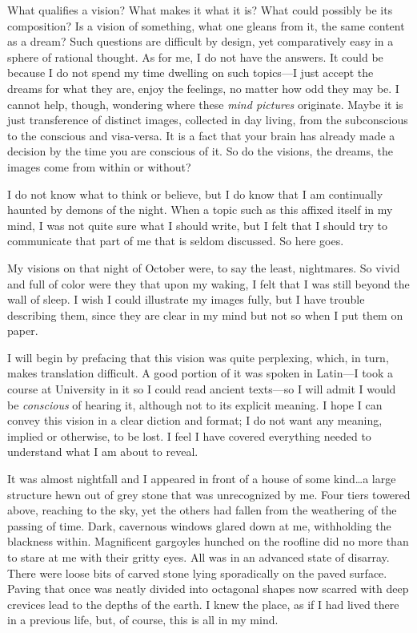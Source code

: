 What qualifies a vision? What makes it what it is? What could possibly
be its composition? Is a vision of something, what one gleans from it,
the same content as a dream? Such questions are difficult by design, yet
comparatively easy in a sphere of rational thought. As for me, I do not
have the answers. It could be because I do not spend my time dwelling on
such topics---I just accept the dreams for what they are, enjoy the
feelings, no matter how odd they may be. I cannot help, though,
wondering where these \emph{mind pictures} originate. Maybe it is just
transference of distinct images, collected in day living, from the
subconscious to the conscious and visa-versa. It is a fact that your
brain has already made a decision by the time you are conscious of it.
So do the visions, the dreams, the images come from within or without?

I do not know what to think or believe, but I do know that I am
continually haunted by demons of the night. When a topic such as this
affixed itself in my mind, I was not quite sure what I should write, but
I felt that I should try to communicate that part of me that is seldom
discussed. So here goes.

My visions on that night of October were, to say the least, nightmares.
So vivid and full of color were they that upon my waking, I felt that I
was still beyond the wall of sleep. I wish I could illustrate my images
fully, but I have trouble describing them, since they are clear in my
mind but not so when I put them on paper.

I will begin by prefacing that this vision was quite perplexing, which,
in turn, makes translation difficult. A good portion of it was spoken in
Latin---I took a course at University in it so I could read ancient
texts---so I will admit I would be \emph{conscious} of hearing it,
although not to its explicit meaning. I hope I can convey this vision in
a clear diction and format; I do not want any meaning, implied or
otherwise, to be lost. I feel I have covered everything needed to
understand what I am about to reveal.

It was almost nightfall and I appeared in front of a house of some
kind\ldots a large structure hewn out of grey stone that was
unrecognized by me. Four tiers towered above, reaching to the sky, yet
the others had fallen from the weathering of the passing of time. Dark,
cavernous windows glared down at me, withholding the blackness within.
Magnificent gargoyles hunched on the roofline did no more than to stare
at me with their gritty eyes. All was in an advanced state of disarray.
There were loose bits of carved stone lying sporadically on the paved
surface. Paving that once was neatly divided into octagonal shapes now
scarred with deep crevices lead to the depths of the earth. I knew the
place, as if I had lived there in a previous life, but, of course, this
is all in my mind.

